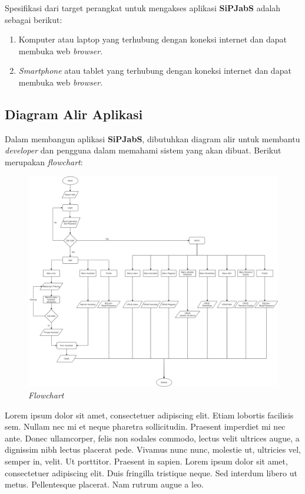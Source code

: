 Spesifikasi dari target perangkat untuk mengakses aplikasi \textbf{SiPJabS} adalah sebagai berikut: 

\begin{enumerate}

\item Komputer atau laptop yang terhubung dengan koneksi internet dan dapat membuka web \textit{browser}.

\item	\textit{Smartphone} atau tablet yang terhubung dengan koneksi internet dan dapat membuka web \textit{browser}.
\end{enumerate}

\subsection{Diagram Alir Aplikasi}

Dalam membangun aplikasi \textbf{SiPJabS}, dibutuhkan diagram alir untuk membantu \textit{developer} dan pengguna dalam memahami sistem yang akan dibuat. Berikut merupakan \textit{flowchart}:

\begin{figure}
	\centering
	\includegraphics[width=1\textwidth]
	{pics/diagram/flowchart.png}
	\caption{\textit{Flowchart}}
	\label{fig:31}
\end{figure}

Lorem ipsum dolor sit amet, consectetuer adipiscing elit. Etiam lobortis facilisis sem.  Nullam nec mi et neque pharetra sollicitudin.  Praesent imperdiet  mi nec ante. Donec ullamcorper, felis non sodales commodo, lectus velit ultrices augue, a dignissim nibh lectus placerat pede. Vivamus nunc nunc, molestie ut, ultricies vel, semper in, velit. Ut porttitor. Praesent in sapien. Lorem ipsum dolor sit amet, consectetuer adipiscing elit. Duis fringilla tristique neque. Sed interdum libero ut metus. Pellentesque placerat.  Nam rutrum augue a leo.  


